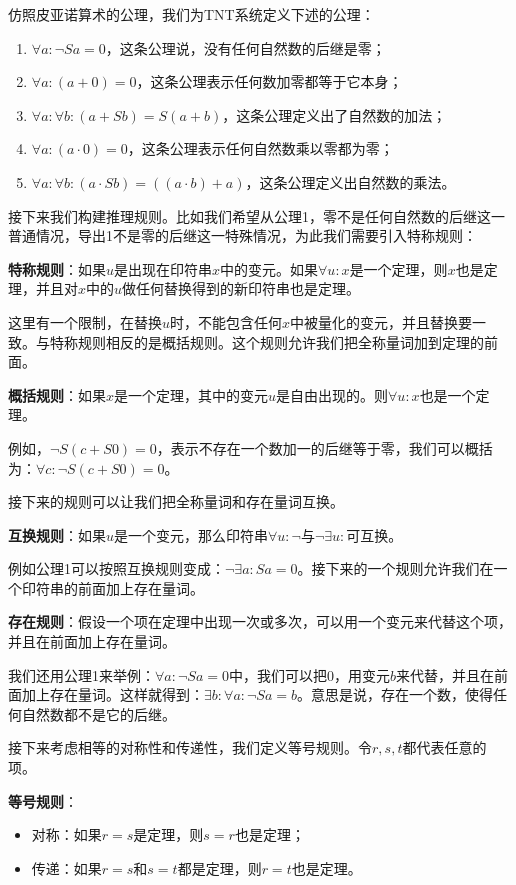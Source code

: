 \documentclass[b5paper]{ctexart}
\begin{document}
仿照皮亚诺算术的公理，我们为TNT系统定义下述的公理：

\begin{enumerate}
\item $\forall a : \lnot Sa = 0$，这条公理说，没有任何自然数的后继是零；
\item $\forall a: (a + 0) = 0$，这条公理表示任何数加零都等于它本身；
\item $\forall a: \forall b: (a + Sb) = S(a + b)$，这条公理定义出了自然数的加法；
\item $\forall a: (a \cdot 0) = 0$，这条公理表示任何自然数乘以零都为零；
\item $\forall a: \forall b: (a \cdot Sb) = ((a \cdot b) + a)$，这条公理定义出自然数的乘法。
\end{enumerate}

接下来我们构建推理规则。比如我们希望从公理1，零不是任何自然数的后继这一普通情况，导出1不是零的后继这一特殊情况，为此我们需要引入特称规则：

\textbf{特称规则}：如果$u$是出现在印符串$x$中的变元。如果$\forall u: x$是一个定理，则$x$也是定理，并且对$x$中的$u$做任何替换得到的新印符串也是定理。

这里有一个限制，在替换$u$时，不能包含任何$x$中被量化的变元，并且替换要一致。与特称规则相反的是概括规则。这个规则允许我们把全称量词加到定理的前面。

\textbf{概括规则}：如果$x$是一个定理，其中的变元$u$是自由出现的。则$\forall u: x$也是一个定理。

例如，$\lnot S(c + S0) = 0$，表示不存在一个数加一的后继等于零，我们可以概括为：$\forall c: \lnot S(c + S0) = 0$。

接下来的规则可以让我们把全称量词和存在量词互换。

\textbf{互换规则}：如果$u$是一个变元，那么印符串$\forall u: \lnot $与$\lnot \exists u:$可互换。

例如公理1可以按照互换规则变成：$\lnot \exists a: Sa = 0$。接下来的一个规则允许我们在一个印符串的前面加上存在量词。

\textbf{存在规则}：假设一个项在定理中出现一次或多次，可以用一个变元来代替这个项，并且在前面加上存在量词。

我们还用公理1来举例：$\forall a: \lnot Sa = 0$中，我们可以把0，用变元$b$来代替，并且在前面加上存在量词。这样就得到：$\exists b: \forall a: \lnot Sa = b$。意思是说，存在一个数，使得任何自然数都不是它的后继。

接下来考虑相等的对称性和传递性，我们定义等号规则。令$r, s, t$都代表任意的项。

\textbf{等号规则}：
\begin{itemize}
\item 对称：如果$r = s$是定理，则$s = r$也是定理；
\item 传递：如果$r = s$和$s = t$都是定理，则$r = t$也是定理。
\end{itemize}
\end{document}
